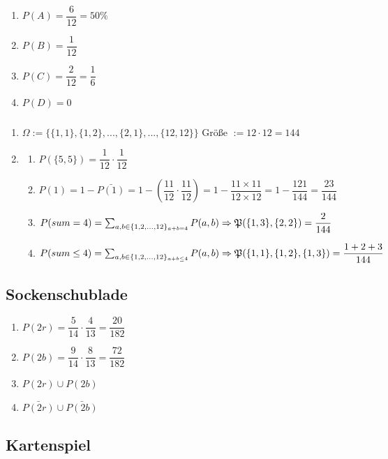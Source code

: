 \documentclass[12pt,a4paper]{article}
\begin{document}
    \subsubsection{}
    \begin{enumerate}
        \item $P(A) = \dfrac{6}{12} = 50\%$
        \item $P(B) = \dfrac{1}{12}$
        \item $P(C) = \dfrac{2}{12} = \dfrac{1}{6}$
        \item $P(D) = 0$
    \end{enumerate}
    \subsubsection{}
    \begin{enumerate}
        \item $\Omega := \{\{1, 1\}, \{1, 2\}, ..., \{2, 1\}, ..., \{12, 12\}\}$ Größe $:= 12 \cdot 12 = 144$
        \item \begin{enumerate}
            \item $P(\{5, 5\}) = \dfrac{1}{12} \cdot \dfrac{1}{12}$
            \item $P(1) = 1 - \bar{P(1)} = 1 - (\dfrac{11}{12} \cdot \dfrac{11}{12}) 
                = 1 - \dfrac{11 \times 11}{12 \times 12} = 1 - \dfrac{121}{144} = \dfrac{23}{144}$
            \item $P(sum=4) = \sum_{a,b\in \{1,2,...,12\}_{a + b = 4}}P(a,b) \\
                \Rightarrow \mathfrak{P}(\{1,3\}, \{2, 2\}) = \dfrac{2}{144}$
            \item $P(sum\le4) = \sum_{a,b\in \{1,2,...,12\}_{a + b \le 4}}P(a,b) \\
                \Rightarrow \mathfrak{P}(\{1,1\},\{1,2\},\{1,3\}) = \dfrac{1+2+3}{144}$
        \end{enumerate}
    \end{enumerate}
    \subsection{Sockenschublade}
    \begin{enumerate}
        \item $P(2r) = \dfrac{5}{14} \cdot \dfrac{4}{13} = \dfrac{20}{182}$
        \item $P(2b) = \dfrac{9}{14} \cdot \dfrac{8}{13} = \dfrac{72}{182}$
        \item $P(2r) \cup P(2b)$
        \item $\bar{P(2r)} \cup \bar{P(2b)}$
    \end{enumerate}
    \subsection{Kartenspiel}


    
\end{document}
